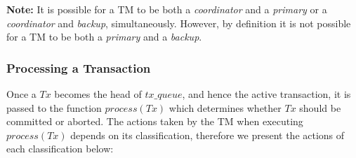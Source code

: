     \textbf{Note:} It is possible for a TM to be both a \emph{coordinator} and a \emph{primary} or a \emph{coordinator} and \emph{backup}, simultaneously.  However, by definition it is not possible for a TM to be both a \emph{primary} and a \emph{backup}.
    
    \subsubsection*{Processing a Transaction}
    Once a $Tx$ becomes the head of $tx\_queue$, and hence the active transaction, it is passed to the function $process(Tx)$ which determines whether $Tx$ should be committed or aborted.  The actions taken by the TM when executing $process(Tx)$ depends on its classification, therefore we present the actions of each classification below:
    
